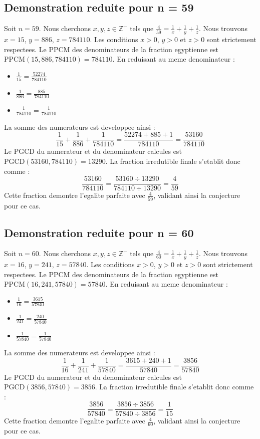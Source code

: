 \documentclass[11pt,a4paper]{article}
\begin{document}
\subsection{Demonstration reduite pour n = 59}
Soit $n = 59$. Nous cherchons $x, y, z \in \mathbb{Z}^{+}$ tels que $\frac{4}{59} = \frac{1}{x} + \frac{1}{y} + \frac{1}{z}$.
Nous trouvons $x = 15$, $y = 886$, $z = 784110$.
Les conditions $x > 0$, $y > 0$ et $z > 0$ sont strictement respectees.
Le PPCM des denominateurs de la fraction egyptienne est $\text{PPCM}(15, 886, 784110) = 784110$.
En reduisant au meme denominateur :
\begin{itemize}
    \item $\frac{1}{15} = \frac{52274}{784110}$
    \item $\frac{1}{886} = \frac{885}{784110}$
    \item $\frac{1}{784110} = \frac{1}{784110}$
\end{itemize}
La somme des numerateurs est developpee ainsi :
$$ \frac{1}{15} + \frac{1}{886} + \frac{1}{784110} = \frac{52274 + 885 + 1}{784110} = \frac{53160}{784110} $$
Le PGCD du numerateur et du denominateur calcules est $\text{PGCD}(53160, 784110) = 13290$.
La fraction irredutible finale s'etablit donc comme :
$$ \frac{53160}{784110} = \frac{53160 \div 13290}{784110 \div 13290} = \frac{4}{59} $$
Cette fraction demontre l'egalite parfaite avec $\frac{4}{59}$, validant ainsi la conjecture pour ce cas.

\subsection{Demonstration reduite pour n = 60}
Soit $n = 60$. Nous cherchons $x, y, z \in \mathbb{Z}^{+}$ tels que $\frac{4}{60} = \frac{1}{x} + \frac{1}{y} + \frac{1}{z}$.
Nous trouvons $x = 16$, $y = 241$, $z = 57840$.
Les conditions $x > 0$, $y > 0$ et $z > 0$ sont strictement respectees.
Le PPCM des denominateurs de la fraction egyptienne est $\text{PPCM}(16, 241, 57840) = 57840$.
En reduisant au meme denominateur :
\begin{itemize}
    \item $\frac{1}{16} = \frac{3615}{57840}$
    \item $\frac{1}{241} = \frac{240}{57840}$
    \item $\frac{1}{57840} = \frac{1}{57840}$
\end{itemize}
La somme des numerateurs est developpee ainsi :
$$ \frac{1}{16} + \frac{1}{241} + \frac{1}{57840} = \frac{3615 + 240 + 1}{57840} = \frac{3856}{57840} $$
Le PGCD du numerateur et du denominateur calcules est $\text{PGCD}(3856, 57840) = 3856$.
La fraction irredutible finale s'etablit donc comme :
$$ \frac{3856}{57840} = \frac{3856 \div 3856}{57840 \div 3856} = \frac{1}{15} $$
Cette fraction demontre l'egalite parfaite avec $\frac{4}{60}$, validant ainsi la conjecture pour ce cas.
\end{document}
